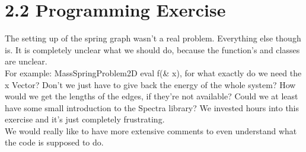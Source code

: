 \documentclass{report}
\begin{document}
	\section*{2.2 Programming Exercise}
	The setting up of the spring graph wasn't a real problem. Everything else though is. It is completely unclear what we should do, because the function's and classes are unclear.\\
For example: MassSpringProblem2D eval f(\& x), for what exactly do we need the x Vector? Don't we just have to give back the energy of the whole system? How would we get the lengths of the edges, if they're not available? Could we at least have some small introduction to the Spectra library? We invested hours into this exercise and it's just completely frustrating.\\
We would really like to have more extensive comments to even understand what the code is supposed to do.\\
\end{document}
